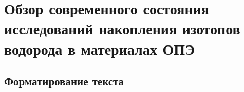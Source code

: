 \chapter{Обзор современного состояния исследований накопления изотопов водорода в материалах ОПЭ}\label{ch:ch1}

\section{Форматирование текста}\label{sec:ch1/sec1}

\FloatBarrier

